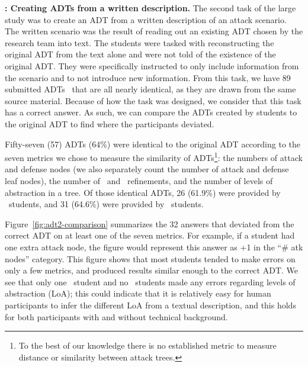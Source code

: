 \textbf{\hypothesis{\hypoSecondADTsub}: Creating ADTs from a written description.}%
The second task of the large study was to create an ADT from a written description of an attack scenario. The written scenario was the result of reading out an existing ADT chosen by the research team into text. The students were tasked with reconstructing the original ADT from the text alone and were not told of the existence of the original ADT. They were specifically instructed to only include information from the scenario and to not introduce new information. From this task, we have 89 submitted ADTs \ that are all nearly identical, as they are drawn from the same source material. Because of how the task was designed, we consider that this task has a correct answer. As such, we can compare the ADTs created by students to the original ADT to find where the participants deviated. 

Fifty-seven (57) ADTs (64\%) were identical to the original ADT according to the seven metrics we chose to measure the similarity of ADTs\footnote{To the best of our knowledge there is no established metric to measure distance or similarity between attack trees.}: the numbers of attack and defense nodes (we also separately count the number of attack and defense leaf nodes), the number of \OR\ and \AND\ refinements, and the number of levels of abstraction in a tree.  Of those identical ADTs, 26 (61.9\%) were provided by \ICS\ students, and 31 (64.6\%) were provided by \SEC\ students. 


Figure~\ref{fig:adt2-comparison} summarizes the 32 answers that deviated from the correct  ADT on at least one of the seven metrics. For example, if a student had one extra attack node, the figure would represent this answer as +1 in the ``\# atk nodes'' category. This figure shows that most students tended to make errors on only a few metrics, and produced results similar enough to the correct ADT. 
We see that only one \SEC\ student and no \ICS\ students made any errors regarding levels of abstraction (LoA); this could indicate that it is relatively easy for human participants to infer the different LoA from a textual description, and this holds for both participants with and without technical background. 


